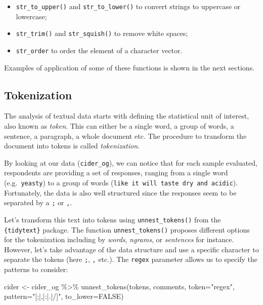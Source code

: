 \documentclass[
]{krantz}
\makeatletter
\newenvironment{Shaded}{\begin{snugshade}}{\end{snugshade}}
\newcommand{\AttributeTok}[1]{\textcolor[rgb]{0.61,0.61,0.61}{#1}}
\newcommand{\ConstantTok}[1]{\textcolor[rgb]{0,0,0}{#1}}
\newcommand{\FunctionTok}[1]{\textcolor[rgb]{0,0,0}{#1}}
\newcommand{\NormalTok}[1]{#1}
\newcommand{\OtherTok}[1]{\textcolor[rgb]{0.37,0.37,0.37}{#1}}
\newcommand{\SpecialCharTok}[1]{\textcolor[rgb]{0,0,0}{#1}}
\newcommand{\StringTok}[1]{\textcolor[rgb]{0.5,0.5,0.5}{#1}}
\providecommand{\tightlist}{%
  \setlength{\itemsep}{0pt}\setlength{\parskip}{0pt}}
\newenvironment{kframe}{%
\medskip{}
\setlength{\fboxsep}{.8em}
 \def\at@end@of@kframe{}%
 \ifinner\ifhmode%
  \def\at@end@of@kframe{\end{minipage}}%
  \begin{minipage}{\columnwidth}%
 \fi\fi%
 \def\FrameCommand##1{\hskip\@totalleftmargin \hskip-\fboxsep
 \colorbox{shadecolor}{##1}\hskip-\fboxsep
     \hskip-\linewidth \hskip-\@totalleftmargin \hskip\columnwidth}%
 \MakeFramed {\advance\hsize-\width
   \@totalleftmargin\z@ \linewidth\hsize
   \@setminipage}}%
 {\par\unskip\endMakeFramed%
 \at@end@of@kframe}
\renewenvironment{Shaded}{\begin{kframe}}{\end{kframe}}
\makeatother
\begin{document}
\begin{itemize}
\tightlist
\item
  \texttt{str\_to\_upper()} and \texttt{str\_to\_lower()} to convert strings to uppercase or lowercase;
\item
  \texttt{str\_trim()} and \texttt{str\_squish()} to remove white spaces;
\item
  \texttt{str\_order} to order the element of a character vector.
\end{itemize}

Examples of application of some of these functions is shown in the next sections.

\hypertarget{tokenization}{%
\subsection{Tokenization}\label{tokenization}}

The analysis of textual data starts with defining the statistical unit of interest, also known as \emph{token}. This can either be a single word, a group of words, a sentence, a paragraph, a whole document etc. The procedure to transform the document into tokens is called \emph{tokenization}.

By looking at our data (\texttt{cider\_og}), we can notice that for each sample evaluated, respondents are providing a set of responses, ranging from a single word (e.g.~\texttt{yeasty}) to a group of words (\texttt{like\ it\ will\ taste\ dry\ and\ acidic}). Fortunately, the data is also well structured since the responses seem to be separated by a \texttt{;} or \texttt{,}.

Let's transform this text into tokens using \texttt{unnest\_tokens()} from the \texttt{\{tidytext\}} package. The function \texttt{unnest\_tokens()} proposes different options for the tokenization including by \emph{words}, \emph{ngrams}, or \emph{sentences} for instance. However, let's take advantage of the data structure and use a specific character to separate the tokens (here \texttt{;}, \texttt{,} etc.). The \texttt{regex} parameter allows us to specify the patterns to consider:

\begin{Shaded}
\begin{Highlighting}[]
\NormalTok{cider }\OtherTok{\textless{}{-}}\NormalTok{ cider\_og }\SpecialCharTok{\%\textgreater{}\%} 
  \FunctionTok{unnest\_tokens}\NormalTok{(tokens, comments, }\AttributeTok{token=}\StringTok{"regex"}\NormalTok{, }\AttributeTok{pattern=}\StringTok{"[;|,|:|.|/]"}\NormalTok{, }\AttributeTok{to\_lower=}\ConstantTok{FALSE}\NormalTok{)}
\end{Highlighting}
\end{Shaded}
\end{document}
